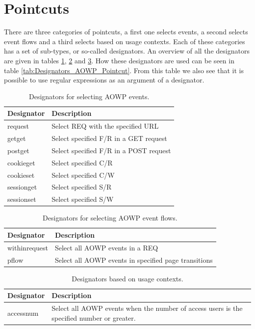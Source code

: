 \documentclass[a4paper]{report}
\begin{document}
\section{Pointcuts}
There are three categories of pointcuts, a first one selects events, a second selects event flows and a third selects based on usage contexts. Each of these categories has a set of sub-types, or so-called designators. An overview of all the designators are given in tables \ref{tab:Designators_AOWP_Events}, \ref{tab:Designators_AOWP_Flows} and \ref{tab:Designators_AOWP_Contexts}. How these designators are used can be seen in table \ref{tab:Designators_AOWP_Pointcut}. From this table we also see that it is possible to use regular expressions as an argument of a designator.\\
\begin{table}[h!]
\centering
\begin{tabular}{l|p{7cm}}
\hline
Designator & Description\\
\hline
\hline
request & Select REQ with the specified URL\\
\hline
getget & Select specified F/R in a GET request\\
\hline
postget & Select specified F/R in a POST request\\
\hline
cookieget & Select specified C/R\\
\hline
cookieset & Select specified C/W\\
\hline
sessionget & Select specified S/R\\
\hline
sessionset & Select specified S/W\\
\hline
\end{tabular}
\caption{Designators for selecting AOWP events.}
\label{tab:Designators_AOWP_Events}
\end{table}
\begin{table}[h!]
\centering
\begin{tabular}{l|p{7cm}}
\hline
Designator & Description\\
\hline
\hline
withinrequest & Select all AOWP events in a REQ\\
\hline
pflow & Select all AOWP events in specified page transitions\\
\hline
\end{tabular}
\caption{Designators for selecting AOWP event flows.}
\label{tab:Designators_AOWP_Flows}
\end{table}
\begin{table}[h!]
\centering
\begin{tabular}{l|p{7cm}}
\hline
Designator & Description\\
\hline
\hline
accessnum & Select all AOWP events when the number of access users is the specified number or greater.\\
\hline
\end{tabular}
\caption{Designators based on usage contexts.}
\label{tab:Designators_AOWP_Contexts}
\end{table}
\end{document}

